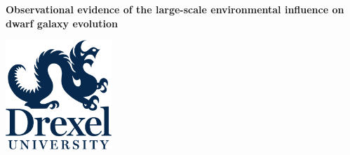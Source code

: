 

\begin{titlepage}

\centering

\bf{Observational evidence of the large-scale environmental influence on dwarf galaxy evolution}







\includegraphics[width=4cm]{drexel-logo}



\end{titlepage}